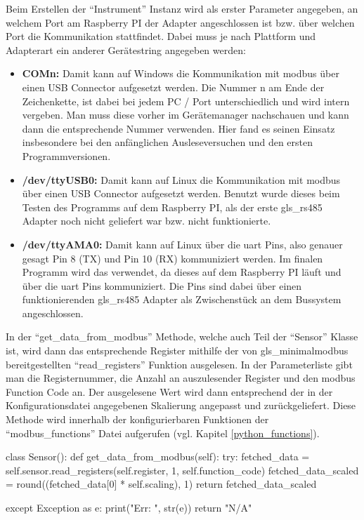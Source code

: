Beim Erstellen der \enquote{Instrument} Instanz wird als erster Parameter angegeben, an welchem Port am Raspberry PI der Adapter angeschlossen ist bzw. über welchen Port die Kommunikation stattfindet. Dabei muss je nach Plattform und Adapterart ein anderer Gerätestring angegeben werden:
\begin{itemize}
\item \textbf{COMn:} Damit kann auf Windows die Kommunikation mit \gls{modbus} über einen USB Connector aufgesetzt werden. Die Nummer n am Ende der Zeichenkette, ist dabei bei jedem PC / Port unterschiedlich und wird intern vergeben. Man muss diese vorher im Gerätemanager nachschauen und kann dann die entsprechende Nummer verwenden. Hier fand es seinen Einsatz insbesondere bei den anfänglichen Ausleseversuchen und den ersten Programmversionen.
\item \textbf{/dev/ttyUSB0:} Damit kann auf Linux die Kommunikation mit \gls{modbus} über einen USB Connector aufgesetzt werden. Benutzt wurde dieses beim Testen des Programms auf dem Raspberry PI, als der erste \gls{gls_rs485} Adapter noch nicht geliefert war bzw. nicht funktionierte.
\item \textbf{/dev/ttyAMA0:} Damit kann auf Linux über die \acf{uart} Pins, also genauer gesagt Pin 8 (TX) und Pin 10 (RX) kommuniziert werden. Im finalen Programm wird das verwendet, da dieses auf dem Raspberry PI läuft und über die \acs{uart} Pins kommuniziert. Die Pins sind dabei über einen funktionierenden \gls{gls_rs485} Adapter als Zwischenstück an dem Bussystem angeschlossen.
\end{itemize}

\vfill

\label{get_data_from_modbus}
In der \enquote{get\_data\_from\_modbus} Methode, welche auch Teil der \enquote{Sensor} Klasse ist, wird dann das entsprechende Register mithilfe der von \gls{gls_minimalmodbus} bereitgestellten \enquote{read\_registers} Funktion ausgelesen. In der Parameterliste gibt man die Registernummer, die Anzahl an auszulesender Register und den \gls{modbus} Function Code an. Der ausgelesene Wert wird dann entsprechend der in der Konfigurationsdatei angegebenen Skalierung angepasst und zurückgeliefert. Diese Methode wird innerhalb der konfigurierbaren Funktionen der \enquote{modbus\_functions} Datei aufgerufen (vgl. Kapitel \ref{python_functions}).

\begin{pythoncode}
class Sensor():
	def get_data_from_modbus(self):
		try:
			fetched_data = self.sensor.read_registers(self.register, 1, self.function_code)
			fetched_data_scaled = round((fetched_data[0] * self.scaling), 1)
			return fetched_data_scaled
		
		except Exception as e:
			print("Err: ", str(e))
			return "N/A"
\end{pythoncode}

